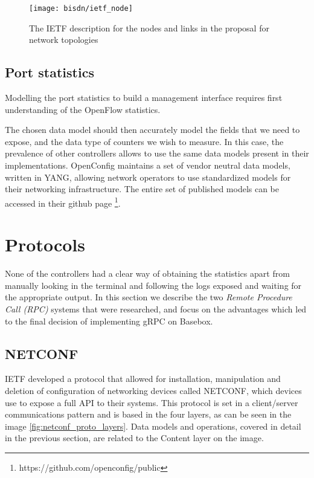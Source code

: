\begin{figure} [h]
    \centering
    \texttt{[image: bisdn/ietf\_node]}
    \caption{The IETF description for the nodes and links in the proposal for network topologies \cite{clemm_data_2017}}
    \label{fig:ietf_topology}
\end{figure}

\subsection {Port statistics}

\par Modelling the port statistics to build a management interface requires first understanding of the OpenFlow statistics. 
\par The chosen data model should then accurately model the fields that we need to expose, and the data type of counters we wish to measure. In this case,
the prevalence of other controllers allows to use the same data models present in their implementations. OpenConfig maintains a set of vendor neutral data models,
written in YANG, allowing network operators to use standardized models for their networking infrastructure. The entire set of published models can be accessed in
their github page \footnote {https://github.com/openconfig/public}.

\section{Protocols}

None of the controllers had a clear way of obtaining the statistics apart from manually looking in the terminal and following the logs exposed and waiting for the
appropriate output. In this section we describe the two \textit {Remote Procedure Call (RPC)} systems that were researched, and focus on the advantages which led 
to the final decision of implementing gRPC on Basebox.

\subsection{NETCONF} \label{sec:netconf}

\par IETF developed a protocol that allowed for installation, manipulation and deletion of configuration of networking devices called NETCONF, which
devices use to expose a full API to their systems. This protocol is set in a client/server communications pattern and is based in the four layers, as can be seen in
the image \ref{fig:netconf_proto_layers}. Data models and operations, covered in detail in the previous section, are related to the Content layer on the image.

